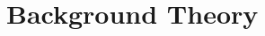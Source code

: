 \chapter{Background Theory}

  
\newenvironment{conditions}[1][where:]
  {#1 \begin{tabular}[t]{>{$}l<{$} @{${}={}$} l}}
  {\end{tabular}\\[\belowdisplayskip]}

\label{ch:background}



